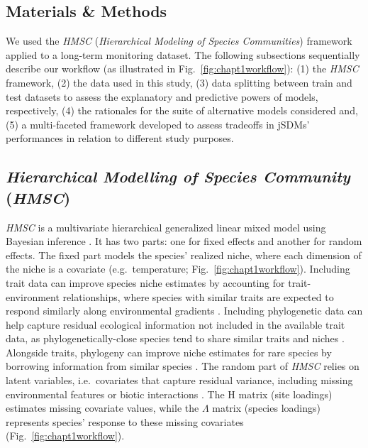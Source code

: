 \begin{refsection}
\clearpage

\hypertarget{materials-methods-chapter1}{%
\section{Materials \& Methods}\label{materials-methods-chapter1}}

We used the \emph{HMSC} (\emph{Hierarchical Modeling of Species
Communities}) framework applied to a long-term monitoring dataset. The
following subsections sequentially describe our workflow (as illustrated
in Fig.~\ref{fig:chapt1workflow}): (1) the \emph{HMSC} framework, (2)
the data used in this study, (3) data splitting between train and test
datasets to assess the explanatory and predictive powers of models,
respectively, (4) the rationales for the suite of alternative models
considered and, (5) a multi-faceted framework developed to assess
tradeoffs in jSDMs' performances in relation to different study
purposes.

\hypertarget{hierarchical-modelling-of-species-community-hmsc}{%
\subsection{\texorpdfstring{\emph{Hierarchical Modelling of Species
Community}
(\emph{HMSC})}{Hierarchical Modelling of Species Community (HMSC)}}\label{hierarchical-modelling-of-species-community-hmsc}}

\emph{HMSC} is a multivariate hierarchical generalized linear mixed
model using Bayesian inference \autocite{Ovaskainen_2020}. It has two
parts: one for fixed effects and another for random effects. The fixed
part models the species' realized niche, where each dimension of the
niche is a covariate (e.g.~temperature; Fig.~\ref{fig:chapt1workflow}).
Including trait data can improve species niche estimates by accounting
for trait-environment relationships, where species with similar traits
are expected to respond similarly along environmental gradients
\autocite{Ovaskainen_2017a}. Including phylogenetic data can help
capture residual ecological information not included in the available
trait data, as phylogenetically-close species tend to share similar
traits and niches \autocite{Wiens_2010}. Alongside traits, phylogeny can
improve niche estimates for rare species by borrowing information from
similar species \autocites[ ]{Ovaskainen_2017a}[
]{Ovaskainen_2017b}{Ovaskainen_2020}. The random part of \emph{HMSC}
relies on latent variables, i.e.~covariates that capture residual
variance, including missing environmental features or biotic
interactions \autocites[ ]{Ovaskainen_2017a}[
]{Ovaskainen_2017b}{Ovaskainen_2020}. The H matrix (site loadings)
estimates missing covariate values, while the \(\Lambda\) matrix
(species loadings) represents species' response to these missing
covariates (Fig.~\ref{fig:chapt1workflow}).


\end{refsection}
